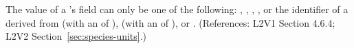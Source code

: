 The value of a \Species's  field can only be one of
the following: , , ,
, or the identifier of a \UnitDefinition derived from
 (with an  of ),  (with an
 of ), or .  (References: L2V1
Section 4.6.4; L2V2 Section~\ref{sec:species-units}.)
